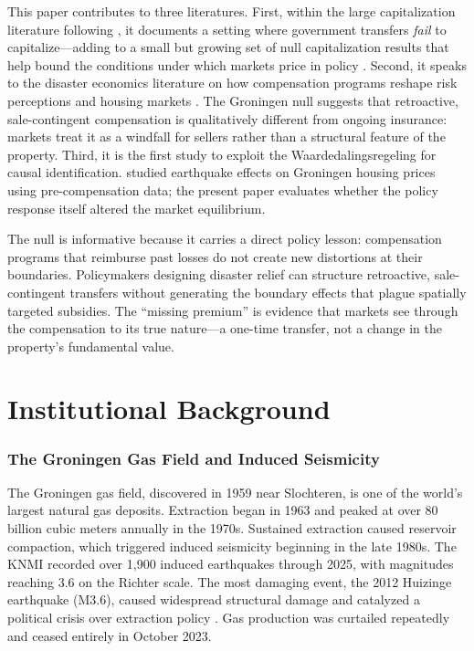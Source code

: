 \documentclass[12pt]{article}
\begin{document}
This paper contributes to three literatures. First, within the large capitalization literature following \citet{oates1969}, it documents a setting where government transfers \emph{fail} to capitalize---adding to a small but growing set of null capitalization results that help bound the conditions under which markets price in policy \citep{elinder2012}. Second, it speaks to the disaster economics literature on how compensation programs reshape risk perceptions and housing markets \citep{gallagher2014, kousky2010, deryugina2017}. The Groningen null suggests that retroactive, sale-contingent compensation is qualitatively different from ongoing insurance: markets treat it as a windfall for sellers rather than a structural feature of the property. Third, it is the first study to exploit the Waardedalingsregeling for causal identification. \citet{koster2015} studied earthquake effects on Groningen housing prices using pre-compensation data; the present paper evaluates whether the policy response itself altered the market equilibrium.

The null is informative because it carries a direct policy lesson: compensation programs that reimburse past losses do not create new distortions at their boundaries. Policymakers designing disaster relief can structure retroactive, sale-contingent transfers without generating the boundary effects that plague spatially targeted subsidies. The ``missing premium'' is evidence that markets see through the compensation to its true nature---a one-time transfer, not a change in the property's fundamental value.

\section{Institutional Background}

\subsubsection*{The Groningen Gas Field and Induced Seismicity} The Groningen gas field, discovered in 1959 near Slochteren, is one of the world's largest natural gas deposits. Extraction began in 1963 and peaked at over 80 billion cubic meters annually in the 1970s. Sustained extraction caused reservoir compaction, which triggered induced seismicity beginning in the late 1980s. The KNMI recorded over 1,900 induced earthquakes through 2025, with magnitudes reaching 3.6 on the Richter scale. The most damaging event, the 2012 Huizinge earthquake (M3.6), caused widespread structural damage and catalyzed a political crisis over extraction policy \citep{bommer2017}. Gas production was curtailed repeatedly and ceased entirely in October 2023.
\end{document}
